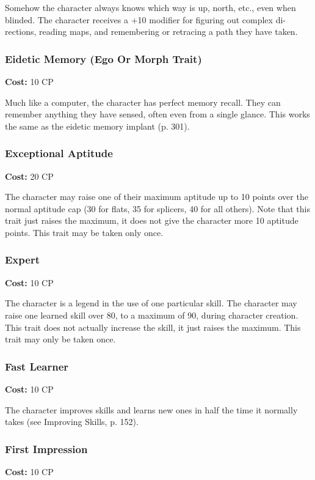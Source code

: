 Somehow the character always knows which way is up, north, etc., even when
blinded. The character receives a +10 modifier for figuring out complex di-
rections, reading maps, and remembering or retracing a path they have taken.

\subsubsection{Eidetic Memory (Ego Or Morph Trait)}
\textbf{Cost:} 10 CP

Much like a computer, the character has perfect memory recall. They can
remember anything they have sensed, often even from a single glance. This works
the same as the eidetic memory implant (p. 301).

\subsubsection{Exceptional Aptitude}
\textbf{Cost:} 20 CP

The character may raise one of their maximum aptitude up to 10 points over the
normal aptitude cap (30 for flats, 35 for splicers, 40 for all others). Note
that this trait just raises the maximum, it does not give the character more 10
aptitude points. This trait may be taken only once.

\subsubsection{Expert}
\textbf{Cost:} 10 CP

The character is a legend in the use of one particular skill. The character may
raise one learned skill over 80, to a maximum of 90, during character
creation. This trait does not actually increase the skill, it just raises the
maximum. This trait may only be taken once.

\subsubsection{Fast Learner}
\textbf{Cost:} 10 CP

The character improves skills and learns new ones in half the time it normally
takes (see Improving Skills, p. 152).

\subsubsection{First Impression}
\textbf{Cost:} 10 CP

